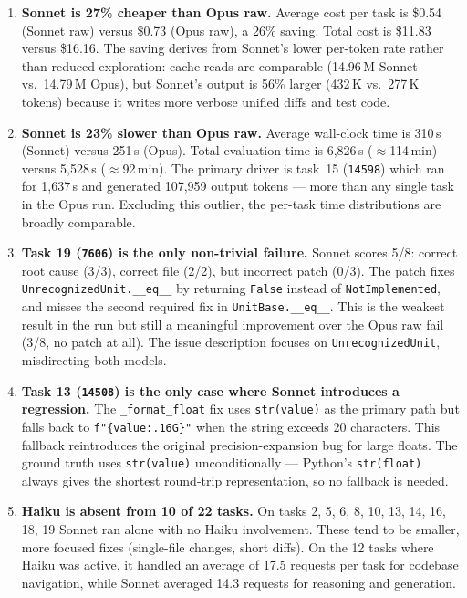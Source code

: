 \begin{enumerate}
\item \textbf{Sonnet is 27\% cheaper than Opus raw.}
      Average cost per task is \$0.54 (Sonnet raw) versus \$0.73
      (Opus raw), a 26\% saving.  Total cost is \$11.83 versus
      \$16.16.  The saving derives from Sonnet's lower per-token rate
      rather than reduced exploration: cache reads are comparable
      (14.96\,M Sonnet vs.\ 14.79\,M Opus), but Sonnet's output is
      56\% larger (432\,K vs.\ 277\,K tokens) because it writes more
      verbose unified diffs and test code.

\item \textbf{Sonnet is 23\% slower than Opus raw.}
      Average wall-clock time is 310\,s (Sonnet) versus 251\,s (Opus).
      Total evaluation time is 6{,}826\,s (\(\approx\)114\,min) versus
      5{,}528\,s (\(\approx\)92\,min).  The primary driver is task~15
      (\texttt{14598}) which ran for 1{,}637\,s and generated
      107{,}959 output tokens --- more than any single task in the Opus
      run.  Excluding this outlier, the per-task time distributions
      are broadly comparable.

\item \textbf{Task 19 (\texttt{7606}) is the only non-trivial failure.}
      Sonnet scores 5/8: correct root cause (3/3), correct file (2/2),
      but incorrect patch (0/3).  The patch fixes
      \texttt{UnrecognizedUnit.\_\_eq\_\_} by returning \texttt{False}
      instead of \texttt{NotImplemented}, and misses the second required
      fix in \texttt{UnitBase.\_\_eq\_\_}.  This is the weakest result
      in the run but still a meaningful improvement over the Opus raw
      fail (3/8, no patch at all).  The issue description focuses on
      \texttt{UnrecognizedUnit}, misdirecting both models.

\item \textbf{Task 13 (\texttt{14508}) is the only case where Sonnet
      introduces a regression.}
      The \texttt{\_format\_float} fix uses \texttt{str(value)} as the
      primary path but falls back to \texttt{f"\{value:.16G\}"} when
      the string exceeds 20 characters.  This fallback reintroduces the
      original precision-expansion bug for large floats.  The ground
      truth uses \texttt{str(value)} unconditionally --- Python's
      \texttt{str(float)} always gives the shortest round-trip
      representation, so no fallback is needed.

\item \textbf{Haiku is absent from 10 of 22 tasks.}
      On tasks 2, 5, 6, 8, 10, 13, 14, 16, 18, 19 Sonnet ran alone with
      no Haiku involvement.  These tend to be smaller, more focused
      fixes (single-file changes, short diffs).  On the 12 tasks where
      Haiku was active, it handled an average of 17.5 requests per task
      for codebase navigation, while Sonnet averaged 14.3 requests for
      reasoning and generation.


\end{enumerate}
